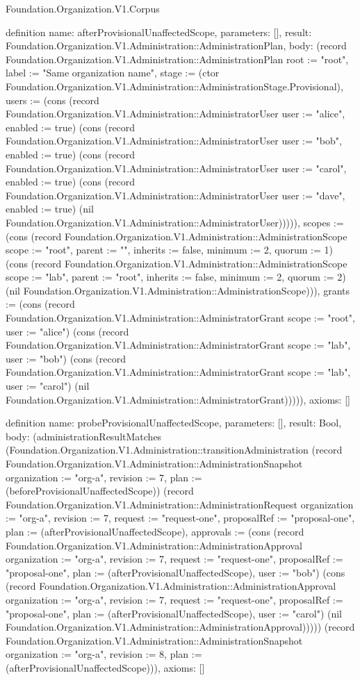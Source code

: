 \begin{lexlean}{Foundation.Organization.V1.Corpus}
\begin{semanticmodule}
definition{
  name: afterProvisionalUnaffectedScope,
  parameters: [],
  result: Foundation.Organization.V1.Administration::AdministrationPlan,
  body: (record Foundation.Organization.V1.Administration::AdministrationPlan {root := "root", label := "Same organization name", stage := (ctor Foundation.Organization.V1.Administration::AdministrationStage.Provisional), users := (cons (record Foundation.Organization.V1.Administration::AdministratorUser {user := "alice", enabled := true}) (cons (record Foundation.Organization.V1.Administration::AdministratorUser {user := "bob", enabled := true}) (cons (record Foundation.Organization.V1.Administration::AdministratorUser {user := "carol", enabled := true}) (cons (record Foundation.Organization.V1.Administration::AdministratorUser {user := "dave", enabled := true}) (nil Foundation.Organization.V1.Administration::AdministratorUser))))), scopes := (cons (record Foundation.Organization.V1.Administration::AdministrationScope {scope := "root", parent := "", inherits := false, minimum := 2, quorum := 1}) (cons (record Foundation.Organization.V1.Administration::AdministrationScope {scope := "lab", parent := "root", inherits := false, minimum := 2, quorum := 2}) (nil Foundation.Organization.V1.Administration::AdministrationScope))), grants := (cons (record Foundation.Organization.V1.Administration::AdministratorGrant {scope := "root", user := "alice"}) (cons (record Foundation.Organization.V1.Administration::AdministratorGrant {scope := "lab", user := "bob"}) (cons (record Foundation.Organization.V1.Administration::AdministratorGrant {scope := "lab", user := "carol"}) (nil Foundation.Organization.V1.Administration::AdministratorGrant))))}),
  axioms: []
}

definition{
  name: probeProvisionalUnaffectedScope,
  parameters: [],
  result: Bool,
  body: (administrationResultMatches (Foundation.Organization.V1.Administration::transitionAdministration (record Foundation.Organization.V1.Administration::AdministrationSnapshot {organization := "org-a", revision := 7, plan := (beforeProvisionalUnaffectedScope)}) (record Foundation.Organization.V1.Administration::AdministrationRequest {organization := "org-a", revision := 7, request := "request-one", proposalRef := "proposal-one", plan := (afterProvisionalUnaffectedScope), approvals := (cons (record Foundation.Organization.V1.Administration::AdministrationApproval {organization := "org-a", revision := 7, request := "request-one", proposalRef := "proposal-one", plan := (afterProvisionalUnaffectedScope), user := "bob"}) (cons (record Foundation.Organization.V1.Administration::AdministrationApproval {organization := "org-a", revision := 7, request := "request-one", proposalRef := "proposal-one", plan := (afterProvisionalUnaffectedScope), user := "carol"}) (nil Foundation.Organization.V1.Administration::AdministrationApproval)))})) (record Foundation.Organization.V1.Administration::AdministrationSnapshot {organization := "org-a", revision := 8, plan := (afterProvisionalUnaffectedScope)})),
  axioms: []
}


\end{semanticmodule}
\end{lexlean}
